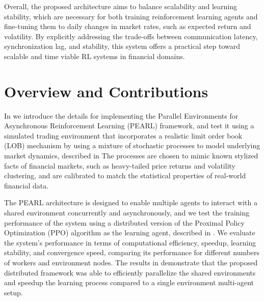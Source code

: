 Overall, the proposed architecture aims to balance scalability and learning stability,
which are necessary for both training reinforcement learning agents and fine-tuning them to daily changes
in market rates, such as expected return and volatility.
By explicitly addressing the trade-offs between communication latency, synchronization lag, and stability,
this system offers a practical step toward scalable and time viable RL systems in financial domains.

\section{Overview and Contributions}
\label{sec:overview}

In  we introduce the details for implementing the Parallel Environments for Asynchronous Reinforcement Learning (PEARL) framework,
and test it using a simulated trading environment that incorporates a realistic limit order book (LOB) mechanism
by using a mixture of stochastic processes to model underlying market dynamics, described in 
The processes are chosen to mimic known stylized facts of financial markets, such as heavy-tailed price returns and
volatility clustering, and are calibrated to match the statistical properties of real-world financial data.

The PEARL architecture is designed to enable multiple agents to interact with a shared environment concurrently and asynchronously,
and we test the training performance of the system using a distributed version of the Proximal Policy Optimization (PPO) algorithm
as the learning agent, described in .
We evaluate the system's performance in terms of computational efficiency, speedup, learning stability, and convergence speed,
comparing its performance for different numbers of workers and environment nodes.
The results in  demonstrate that the proposed distributed framework
was able to efficiently parallelize the shared environments and speedup the learning process compared to a single environment multi-agent setup.
